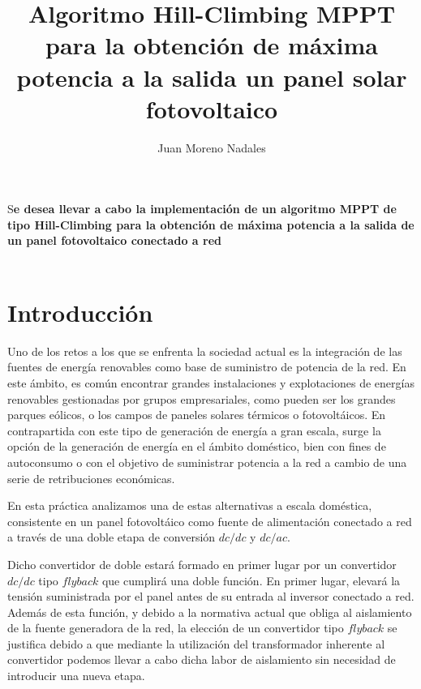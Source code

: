 \documentclass[	DIV=calc,%
							paper=letter,%
							fontsize=12pt%
                            ]{scrartcl}	 					%
\title{Algoritmo Hill-Climbing MPPT para la obtención de máxima potencia a la salida un panel solar fotovoltaico }					%
\author{Juan Moreno Nadales }											%
\date{}																				%
\newcommand{\initial}[1]{%
     \lettrine[lines=3,lhang=0.3,nindent=0em]{
     				\color{DarkGoldenrod}
     				{\textsf{#1}}}{}}
\begin{document}
\maketitle
\thispagestyle{fancy} 			%
\initial{S}\textbf{e desea llevar a cabo la implementación de un algoritmo MPPT de tipo Hill-Climbing para la obtención de máxima potencia a la salida de un panel fotovoltaico conectado a red}\\\\


\newpage

\tableofcontents
\listoffigures
\newpage


\section{Introducción}

Uno de los retos a los que se enfrenta la sociedad actual es la integración de las fuentes de energía renovables como base de suministro de potencia de la red. En este ámbito, es común encontrar grandes instalaciones y explotaciones de energías renovables gestionadas por grupos empresariales, como pueden ser los grandes parques eólicos, o los campos de paneles solares térmicos o fotovoltáicos. En contrapartida con este tipo de generación de energía a gran escala, surge la opción de la generación de energía en el ámbito doméstico, bien con fines de autoconsumo o con el objetivo de suministrar potencia a la red a cambio de una serie de retribuciones económicas.

\hfill

En esta práctica analizamos una de estas alternativas a escala doméstica, consistente en un panel fotovoltáico como fuente de alimentación conectado a red a través de una doble etapa de conversión $dc/dc$ y $dc/ac$.

\hfill

Dicho convertidor de doble estará formado en primer lugar por un convertidor $dc/dc$ tipo $flyback$ que cumplirá una doble función. En primer lugar, elevará la tensión suministrada por el panel antes de su entrada al inversor conectado a red. Además de esta función, y debido a la normativa actual que obliga al aislamiento de la fuente generadora de la red, la elección de un convertidor tipo $flyback$ se justifica debido a que mediante la utilización del transformador inherente al convertidor podemos llevar a cabo dicha labor de aislamiento sin necesidad de introducir una nueva etapa.
\end{document}
